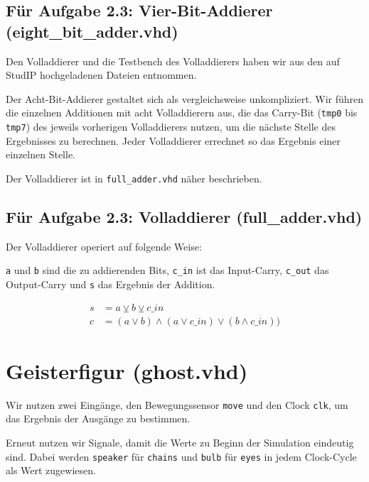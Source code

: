 \documentclass{pi3}
\begin{document}


\subsection*{Für Aufgabe 2.3: Vier-Bit-Addierer (eight\_bit\_adder.vhd)}

Den Volladdierer und die Testbench des Volladdierers haben wir aus den auf StudIP hochgeladenen Dateien entnommen.

Der Acht-Bit-Addierer gestaltet sich als vergleichsweise unkompliziert. Wir führen die einzelnen Additionen mit acht Volladdierern aus, die das Carry-Bit (\texttt{tmp0} bis \texttt{tmp7}) des jeweils vorherigen Volladdierers nutzen, um die nächste Stelle des Ergebnisses zu berechnen. Jeder Volladdierer errechnet so das Ergebnis einer einzelnen Stelle.

Der Volladdierer ist in \texttt{full\_adder.vhd} näher beschrieben.



\subsection*{Für Aufgabe 2.3: Volladdierer (full\_adder.vhd)}
Der Volladdierer operiert auf folgende Weise:

\texttt{a} und \texttt{b} sind die zu addierenden Bits, \texttt{c\_in} ist das Input-Carry, \texttt{c\_out} das Output-Carry und \texttt{s} das Ergebnis der Addition.

\begin{align*}
s &= a \veebar b \veebar c\_in\\
c &= (a \vee b) \wedge (a \vee c\_in) \vee (b \wedge c\_in))
\end{align*}



\section{Geisterfigur (ghost.vhd)}

Wir nutzen zwei Eingänge, den Bewegungssensor \texttt{move} und den Clock \texttt{clk}, um das Ergebnis der Ausgänge zu bestimmen. 



Erneut nutzen wir Signale, damit die Werte zu Beginn der Simulation eindeutig sind. Dabei werden \texttt{speaker} für \texttt{chains} und \texttt{bulb} für \texttt{eyes} in jedem Clock-Cycle als Wert zugewiesen. 
\end{document}
